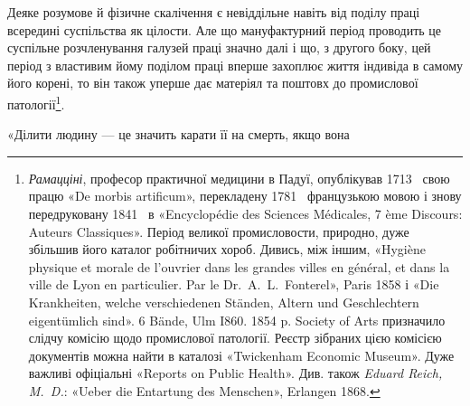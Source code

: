 Деяке розумове й фізичне скалічення є невіддільне навіть від
поділу праці всередині суспільства як цілости. Але що мануфактурний
період проводить це суспільне розчленування галузей
праці значно далі і що, з другого боку, цей період з властивим
йому поділом праці вперше захоплює життя індивіда в самому
його корені, то він також уперше дає матеріял та поштовх до
промислової патології\footnote{
\emph{Рамацціні}, професор практичної медицини в Падуї, опублікував
1713~ свою працю «De morbis artificum», перекладену 1781~
французькою мовою і знову передруковану 1841~ в «Encyclopédie des
Sciences Médicales, 7 ème Discours: Auteurs Classiques». Період великої
промисловости, природно, дуже збільшив його каталог робітничих хороб.
Дивись, між іншим, «Hygiène physique et morale de l’ouvrier dans les
grandes villes en général, et dans la ville de Lyon en particulier. Par le
Dr.~A.~L.~Fonterel», Paris 1858 і «Die Krankheiten, welche verschiedenen
Ständen, Altern und Geschlechtern eigentümlich sind». 6 Bände, Ulm I860.
1854 p. Society of Arts призначило слідчу комісію щодо промислової
патології. Реєстр зібраних цією комісією документів можна найти в каталозі
«Twickenham Economic Museum». Дуже важливі офіціальні «Reports
on Public Health». Див. також \emph{Eduard Reich, M.~D.}: «Ueber
die Entartung des Menschen», Erlangen 1868.
}.

«Ділити людину — це значить карати її на смерть, якщо вона
\parbreak{}  %
